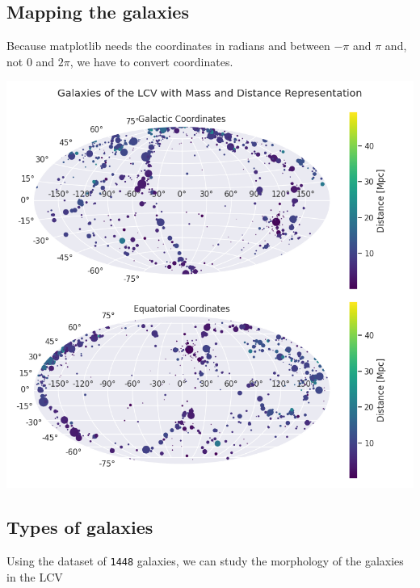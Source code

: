 \documentclass[a4paper]{article}
\begin{document}
\subsection{Mapping the galaxies}
\label{sec:orgedc2b80}

Because matplotlib needs the coordinates in radians and between \(-\pi\) and \(\pi\)
and, not 0 and \(2\pi\), we have to convert coordinates.

\begin{center}
\includegraphics[width=.9\linewidth]{figure/mapping.png}
\end{center}


\subsection{Types of galaxies}
\label{sec:org026d262}

Using the dataset of \texttt{1448}
galaxies, we can study the morphology of the galaxies in the LCV
\end{document}
